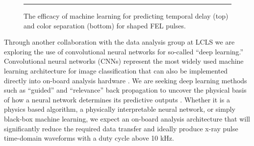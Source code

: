 \begin{wrapfigure}[27]{r}{.5\linewidth}
\vspace{-1\baselineskip}
\centerline{
}
\hrule
\centerline{
}
\vspace{-2\baselineskip}
\caption{\label{AlvaroIdea} The efficacy of machine learning for predicting temporal delay (top) and color separation (bottom) for shaped FEL pulses. \cite{AlvaroML2016}}
\end{wrapfigure}

Through another collaboration with the data analysis group at LCLS we are exploring the use of convolutional neural networks for so-called ``deep learning.'' %
Convolutional neural networks (CNNs) represent the most widely used machine learning architecture for image classification that can also be implemented directly into on-board analysis hardware \cite{cognimem}.
We are seeking deep learning methods such as ``guided'' and ``relevance'' back propagation to uncover the physical basis of how a neural network determines its predictive outputs \cite{Mihir}.
Whether it is a physics based algorithm, a physically interpretable neural network, or simply black-box machine learning, we expect an on-board analysis architecture that will significantly reduce the required data transfer and ideally produce x-ray pulse time-domain waveforms with a duty cycle above 10 kHz.


